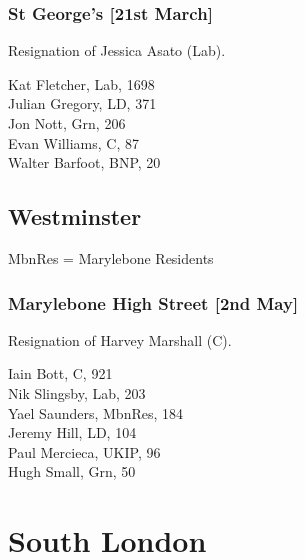 \documentclass[a4paper,openany,10pt]{book}
\begin{document}
\subsubsection*{St George's \hspace*{\fill}\nolinebreak[1]%
\enspace\hspace*{\fill}
[21st March]}


Resignation of Jessica Asato (Lab).



Kat Fletcher, Lab, 1698\\
Julian Gregory, LD, 371\\
Jon Nott, Grn, 206\\
Evan Williams, C, 87\\
Walter Barfoot, BNP, 20\\


\subsection*{Westminster}

MbnRes = Marylebone Residents

\subsubsection*{Marylebone High Street \hspace*{\fill}\nolinebreak[1]%
\enspace\hspace*{\fill}
[2nd May]}


Resignation of Harvey Marshall (C).



Iain Bott, C, 921\\
Nik Slingsby, Lab, 203\\
Yael Saunders, MbnRes, 184\\
Jeremy Hill, LD, 104\\
Paul Mercieca, UKIP, 96\\
Hugh Small, Grn, 50\\




\section{South London}
\end{document}
